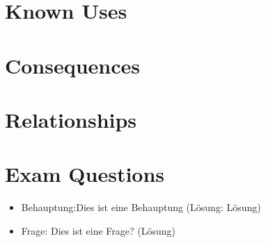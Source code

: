 \section{Known Uses}


\section{Consequences}


\section{Relationships}


\section{Exam Questions}
\begin{itemize}
  	\item Behauptung:Dies ist eine Behauptung (Lösung: Lösung)
    \item Frage: Dies ist eine Frage? (Lösung)
\end{itemize}
